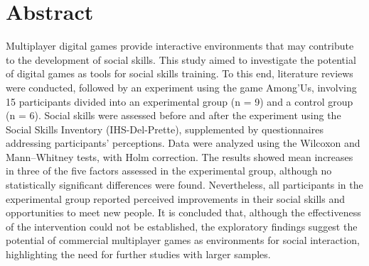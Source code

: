 \chapter*{Abstract}

Multiplayer digital games provide interactive environments that may contribute to the development of social skills. This study aimed to investigate the potential of digital games as tools for social skills training. To this end, literature reviews were conducted, followed by an experiment using the game Among’Us, involving 15 participants divided into an experimental group (n = 9) and a control group (n = 6). Social skills were assessed before and after the experiment using the Social Skills Inventory (IHS-Del-Prette), supplemented by questionnaires addressing participants' perceptions. Data were analyzed using the Wilcoxon and Mann–Whitney tests, with Holm correction. The results showed mean increases in three of the five factors assessed in the experimental group, although no statistically significant differences were found. Nevertheless, all participants in the experimental group reported perceived improvements in their social skills and opportunities to meet new people. It is concluded that, although the effectiveness of the intervention could not be established, the exploratory findings suggest the potential of commercial multiplayer games as environments for social interaction, highlighting the need for further studies with larger samples.